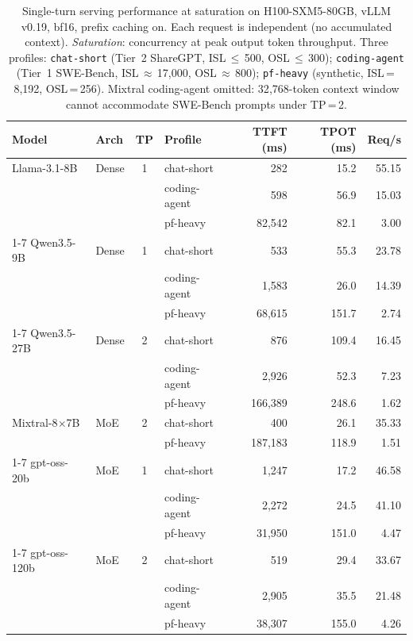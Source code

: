 \begin{table}[t]
\caption{Single-turn serving performance at saturation on H100-SXM5-80GB, vLLM v0.19, bf16, prefix caching on. Each request is independent (no accumulated context). \textit{Saturation}: concurrency at peak output token throughput. Three profiles: \texttt{chat-short} (Tier~2 ShareGPT, ISL\,$\leq$\,500, OSL\,$\leq$\,300); \texttt{coding-agent} (Tier~1 SWE-Bench, ISL\,$\approx$\,17{,}000, OSL\,$\approx$\,800); \texttt{pf-heavy} (synthetic, ISL\,=\,8{,}192, OSL\,=\,256). Mixtral coding-agent omitted: 32{,}768-token context window cannot accommodate SWE-Bench prompts under TP\,=\,2.}
\label{tab:serving-perf}
\centering
\small
\setlength{\tabcolsep}{4pt}
\begin{tabular}{@{}llc l rrr@{}}
\toprule
\textbf{Model} & \textbf{Arch} & \textbf{TP} & \textbf{Profile} & \textbf{TTFT (ms)} & \textbf{TPOT (ms)} & \textbf{Req/s} \\
\midrule
Llama-3.1-8B   & Dense & 1 & chat-short    &       282 &  15.2 & 55.15 \\
               &       &   & coding-agent  &       598 &  56.9 & 15.03 \\
               &       &   & pf-heavy      &  82{,}542 &  82.1 &  3.00 \\
\cmidrule(lr){1-7}
Qwen3.5-9B     & Dense & 1 & chat-short    &       533 &  55.3 & 23.78 \\
               &       &   & coding-agent  &   1{,}583 &  26.0 & 14.39 \\
               &       &   & pf-heavy      &  68{,}615 & 151.7 &  2.74 \\
\cmidrule(lr){1-7}
Qwen3.5-27B    & Dense & 2 & chat-short    &       876 & 109.4 & 16.45 \\
               &       &   & coding-agent  &   2{,}926 &  52.3 &  7.23 \\
               &       &   & pf-heavy      & 166{,}389 & 248.6 &  1.62 \\
\midrule
Mixtral-8$\times$7B & MoE & 2 & chat-short &       400 &  26.1 & 35.33 \\
               &       &   & pf-heavy      & 187{,}183 & 118.9 &  1.51 \\
\cmidrule(lr){1-7}
gpt-oss-20b    & MoE   & 1 & chat-short    &   1{,}247 &  17.2 & 46.58 \\
               &       &   & coding-agent  &   2{,}272 &  24.5 & 41.10 \\
               &       &   & pf-heavy      &  31{,}950 & 151.0 &  4.47 \\
\cmidrule(lr){1-7}
gpt-oss-120b   & MoE   & 2 & chat-short    &       519 &  29.4 & 33.67 \\
               &       &   & coding-agent  &   2{,}905 &  35.5 & 21.48 \\
               &       &   & pf-heavy      &  38{,}307 & 155.0 &  4.26 \\
\bottomrule
\end{tabular}
\end{table}

